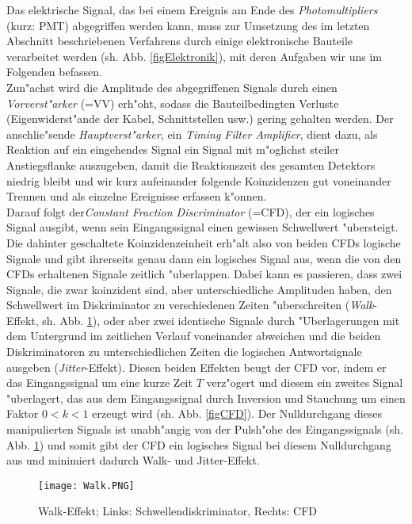 \documentclass{article}
\begin{document}
Das elektrische Signal, das bei einem Ereignis am Ende des \textit{Photomultipliers} (kurz: PMT) abgegriffen werden kann, muss zur Umsetzung des im letzten Abschnitt beschriebenen Verfahrens durch einige elektronische Bauteile verarbeitet werden (sh. Abb. \ref{figElektronik}), mit deren Aufgaben wir uns im Folgenden befassen.\\
Zun"achst wird die Amplitude des abgegriffenen Signals durch einen \textit{Vorverst"arker} (=VV) erh"oht, sodass die Bauteilbedingten Verluste (Eigenwiderst"ande der Kabel, Schnittstellen usw.) gering gehalten werden. Der anschlie"sende \textit{Hauptverst"arker}, ein \textit{Timing Filter Amplifier}, dient dazu, als Reaktion auf ein eingehendes Signal ein Signal mit m"oglichst steiler Anstiegsflanke auszugeben, damit die Reaktionszeit des gesamten Detektors niedrig bleibt und wir kurz aufeinander folgende Koinzidenzen gut voneinander Trennen und als einzelne Ereignisse erfassen k"onnen.\\
Darauf folgt der\textit{Constant Fraction Discriminator} (=CFD), der ein logisches Signal ausgibt, wenn sein Eingangssignal einen gewissen Schwellwert "ubersteigt. Die dahinter geschaltete Koinzidenzeinheit erh"alt also von beiden CFDs logische Signale und gibt ihrerseits genau dann ein logisches Signal aus, wenn die von den CFDs erhaltenen Signale zeitlich "uberlappen. Dabei kann es passieren, dass zwei Signale, die zwar koinzident sind, aber unterschiedliche Amplituden haben, den Schwellwert im Diskriminator zu verschiedenen Zeiten "uberschreiten (\textit{Walk}-Effekt, sh. Abb. \ref{figWalkDerHurensohn}), oder aber zwei identische Signale durch "Uberlagerungen mit dem Untergrund im zeitlichen Verlauf voneinander abweichen und die beiden Diskriminatoren zu unterschiedlichen Zeiten die logischen Antwortsignale ausgeben (\textit{Jitter}-Effekt). Diesen beiden Effekten beugt der CFD vor, indem er das Eingangssignal um eine kurze Zeit $T$ verz"ogert und diesem ein zweites Signal "uberlagert, das aus dem Eingangssignal durch Inversion und Stauchung um einen Faktor $0<k<1$ erzeugt wird (sh. Abb. \ref{figCFD}). Der Nulldurchgang dieses manipulierten Signals ist unabh"angig von der Pulsh"ohe des Eingangssignals (sh. Abb. \ref{figWalkDerHurensohn}) und somit gibt der CFD ein logisches Signal bei diesem Nulldurchgang aus und minimiert dadurch Walk- und Jitter-Effekt.


\begin{figure}[H]
	\centering
	\texttt{[image: Walk.PNG]}
	\caption[Walk-Effekt; Links: Schwellendiskriminator, Rechts: CFD]{Walk-Effekt; Links: Schwellendiskriminator, Rechts: CFD\footnotemark}
	\label{figWalkDerHurensohn}
\end{figure}
\end{document}
